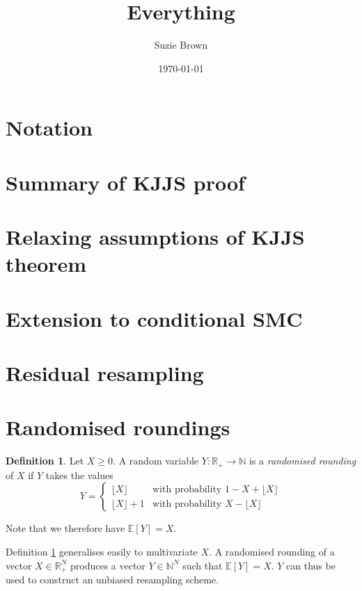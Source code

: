 \documentclass[fleqn]{article}
\title{Everything}
\author{Suzie Brown}
\date{\today}
\theoremstyle{definition}
\newtheorem{defn}{Definition}
\newcommand{\E}{\mathbb{E}}
\begin{document}
\maketitle
\thispagestyle{fancy}

\section{Notation}

\section{Summary of KJJS proof}

\section{Relaxing assumptions of KJJS theorem}

\section{Extension to conditional SMC}

\section{Residual resampling}

\section{Randomised roundings}
\begin{defn}\label{defn:randround_1D}
Let $X\geq0$. A random variable $Y: \mathbb{R}_+ \to \mathbb{N}$ is a \emph{randomised rounding} of $X$ if $Y$ takes the values
\begin{equation*}
Y=
\begin{cases}
 \lfloor X \rfloor & \text{with probability } 1- X+ \lfloor X \rfloor \\
  \lfloor X \rfloor +1 & \text{with probability } X- \lfloor X \rfloor 
\end{cases}
\end{equation*}
\end{defn}
Note that we therefore have $\E[Y] =X$.

Definition \ref{defn:randround_1D} generalises easily to multivariate $X$. A randomised rounding of a vector $X \in \mathbb{R}_+^N$ produces a vector $Y \in \mathbb{N}^N$ such that $\E[Y]=X$. $Y$ can thus be used to construct an unbiased resampling scheme.
\end{document}
